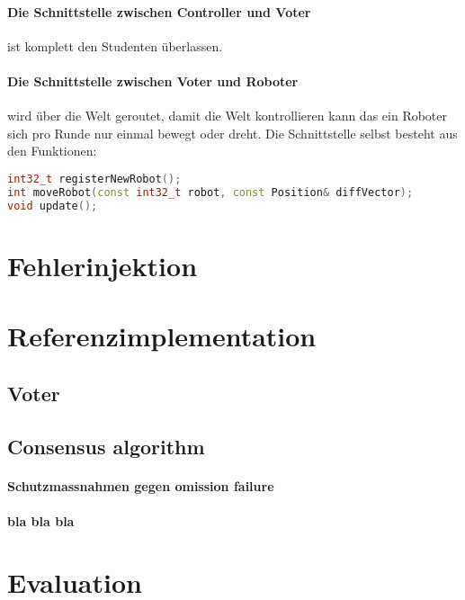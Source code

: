\documentclass[
    12pt,
    bibliography=totoc,
    ngerman
]{scrartcl}
\begin{document}
\paragraph{Die Schnittstelle zwischen Controller und Voter} ist komplett den Studenten {\"{u}}berlassen.

\paragraph{Die Schnittstelle zwischen Voter und Roboter} wird {\"{u}}ber die Welt geroutet, damit die Welt kontrollieren kann das ein
Roboter sich pro Runde nur einmal bewegt oder dreht. Die Schnittstelle selbst besteht aus den Funktionen:
\begin{lstlisting}[frame=single, language=c++] 
int32_t registerNewRobot();
int moveRobot(const int32_t robot, const Position& diffVector);
void update();
\end{lstlisting}


\clearpage
\section{Fehlerinjektion}

\clearpage
\section{Referenzimplementation}
\subsection{Voter}\label{voter}
\subsection{Consensus algorithm}
\paragraph{Schutzmassnahmen gegen omission failure}
\paragraph{bla bla bla}


\clearpage
\section{Evaluation}


\clearpage

%

\end{document}
